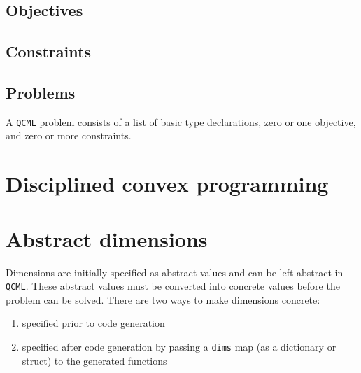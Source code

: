 \documentclass[11pt]{article}
\def\qcml{\texttt{QCML}\xspace}
\begin{document}

% 
% 
% 
% 
% 


\subsection{Objectives}
\subsection{Constraints}
\subsection{Problems}
A \qcml problem consists of a list of basic type declarations, zero or one
objective, and zero or more constraints. 

\section{Disciplined convex programming}
\label{s-dcp}

\section{Abstract dimensions}
\label{s-abstract-dims}
Dimensions are initially specified as abstract values and can be left abstract
in \qcml. These abstract values must be converted into concrete values
before the problem can be solved. There are two ways to make dimensions 
concrete:
\begin{enumerate}
\item specified prior to code generation
\item specified after code generation by passing a {\tt dims} map (as a
  dictionary or struct) to the generated functions %
\end{enumerate}
\end{document}
